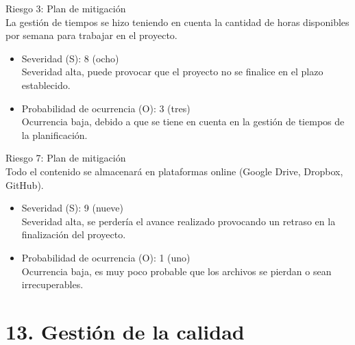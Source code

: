 \documentclass[11pt]{charter}
\begin{document}
Riesgo 3: Plan de mitigación \\
La gestión de tiempos se hizo teniendo en cuenta la cantidad de horas disponibles por semana para trabajar en el proyecto.
\begin{itemize}
\item Severidad (S): 8 (ocho) \\
Severidad alta, puede provocar que el proyecto no se finalice en el plazo establecido.
\item Probabilidad de ocurrencia (O): 3 (tres) \\
Ocurrencia baja, debido a que se tiene en cuenta en la gestión de tiempos de la planificación.
\end{itemize} 

Riesgo 7: Plan de mitigación \\
Todo el contenido se almacenará en plataformas online (Google Drive, Dropbox, GitHub).
\begin{itemize}
\item Severidad (S): 9 (nueve) \\
Severidad alta, se perdería el avance realizado provocando un retraso en la finalización del proyecto.
\item Probabilidad de ocurrencia (O): 1 (uno) \\
Ocurrencia baja, es muy poco probable que los archivos se pierdan o sean irrecuperables.
\end{itemize}

\section{13. Gestión de la calidad}
\label{sec:calidad}
\end{document}
